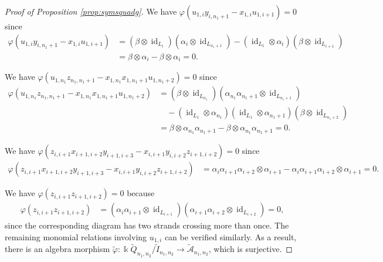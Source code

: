\documentclass[a4paper, reqno, 11pt]{amsart}
\theoremstyle{definition}
\begin{document}
\begin{proof}[Proof of Proposition \ref{prop:symsquadg}]
		We have $\varphi(u_{1,i} y_{i,n_1+1} - x_{1,i} u_{1,i+1}) = 0$ since
		\begin{align*}
			\varphi(u_{1,i} y_{i,n_1+1} - x_{1,i} u_{1,i+1})
			&= (\beta \otimes \operatorname{id}_{L_i})(\alpha_i \otimes \operatorname{id}_{L_{n_1+1}}) - (\operatorname{id}_{L_1} \otimes \alpha_i)(\beta \otimes \operatorname{id}_{L_{i+1}})\\
			&= \beta \otimes \alpha_i - \beta \otimes \alpha_i = 0.
		\end{align*}
		
		 We have $\varphi(u_{1,n_1}z_{n_1,n_1+1}-x_{1,n_1}x_{1,n_1+1}u_{1,n_1+2}) = 0$ since
		\begin{align*}
			\varphi(u_{1,n_1}z_{n_1,n_1+1}-x_{1,n_1}x_{1,n_1+1}u_{1,n_1+2})&=(\beta \otimes \operatorname{id}_{L_{n_1}})(\alpha_{n_1}\alpha_{n_1+1} \otimes \operatorname{id}_{L_{n_1+1}})\\
			&\quad-(\operatorname{id}_{L_1} \otimes \alpha_{n_1})(\operatorname{id}_{L_1}\otimes \alpha_{n_1+1})(\beta \otimes \operatorname{id}_{L_{n_1+2}})\\
			&=\beta \otimes \alpha_{n_1}\alpha_{n_1+1}-\beta \otimes \alpha_{n_1}\alpha_{n_1+1} = 0.
		\end{align*}
		
		We have $\varphi(z_{i,i+1} x_{i+1,i+2} y_{i+1,i+3} - x_{i,i+1} y_{i,i+2} z_{i+1,i+2}) = 0$ since
		\begin{align*}
			\varphi(z_{i,i+1} x_{i+1,i+2} y_{i+1,i+3} - x_{i,i+1} y_{i,i+2} z_{i+1,i+2})
			&= \alpha_i\alpha_{i+1}\alpha_{i+2} \otimes \alpha_{i+1} - \alpha_i\alpha_{i+1}\alpha_{i+2} \otimes \alpha_{i+1} = 0.
		\end{align*}
		
		We have $\varphi(z_{i,i+1} z_{i+1,i+2}) = 0$ because
		\begin{align*}
			\varphi(z_{i,i+1} z_{i+1,i+2})
			&= (\alpha_i\alpha_{i+1} \otimes \operatorname{id}_{L_{i+1}})(\alpha_{i+1}\alpha_{i+2} \otimes \operatorname{id}_{L_{i+2}}) = 0,
		\end{align*}
		since the corresponding diagram has two strands crossing more than once. The remaining monomial relations involving $u_{1,i}$ can be verified similarly. As a result, there is an algebra morphism $\widetilde \varphi\colon \Bbbk \widetilde Q_{n_1, n_2}/\widetilde I_{n_1,n_2} \to \widetilde{\mathcal{A}}_{n_1,n_2}$, which is surjective.
		

\end{proof}
\end{document}
